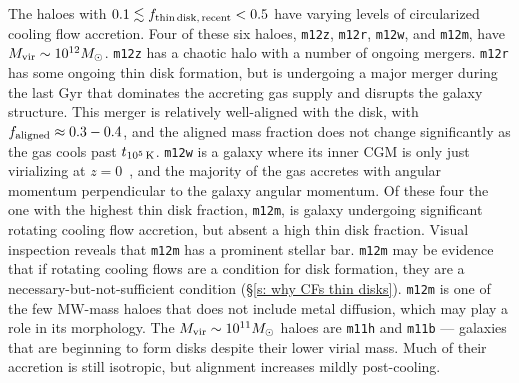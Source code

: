 \documentclass[fleqn,usenatbib]{mnras}
\newcommand{\fthin}{f_{\rm thin\,disk,\,recent}}
\newcommand{\tcools}{t_{10^5\,{\rm K}}}
\begin{document}
The haloes with $0.1 \lesssim \fthin < 0.5$ have varying levels of circularized cooling flow accretion.
Four of these six haloes, \texttt{m12z}, \texttt{m12r}, \texttt{m12w}, and \texttt{m12m}, have $M_{\rm vir} \sim 10^{12} M_\odot$.
\texttt{m12z} has a chaotic halo with a number of ongoing mergers.
\texttt{m12r} has some ongoing thin disk formation, but is undergoing a major merger during the last Gyr that dominates the accreting gas supply and disrupts the galaxy structure.
This merger is relatively well-aligned with the disk, with $f_{\rm aligned} \approx 0.3-0.4$, and the aligned mass fraction does not change significantly as the gas cools past $\tcools$.
\texttt{m12w} is a galaxy where its inner CGM is only just virializing at $z=0$~\citep{Yu2021}, and the majority of the gas accretes with angular momentum perpendicular to the galaxy angular momentum.
Of these four the one with the highest thin disk fraction, \texttt{m12m}, is galaxy undergoing significant rotating cooling flow accretion, but absent a high thin disk fraction.
Visual inspection reveals that \texttt{m12m} has a prominent stellar bar.
\texttt{m12m} may be evidence that if rotating cooling flows are a condition for disk formation, they are a necessary-but-not-sufficient condition (\S\ref{s: why CFs thin disks}).
\texttt{m12m} is one of the few MW-mass haloes that does not include metal diffusion, which may play a role in its morphology.
The $M_{\rm vir} \sim 10^{11} M_\odot$ haloes are \texttt{m11h} and \texttt{m11b} --- galaxies that are beginning to form disks despite their lower virial mass.
Much of their accretion is still isotropic, but alignment increases mildly post-cooling.


\bsp	%
\label{lastpage}
\end{document}
